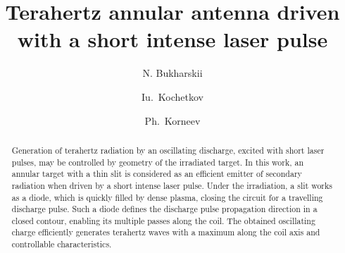 \documentclass[aps,prl,twocolumn,superscriptaddress]{revtex4-1}
\begin{document}

\title{Terahertz annular antenna driven with a short intense laser pulse}%


\author{N. Bukharskii}



\author{Iu.~Kochetkov}

\author{Ph.~Korneev}

\begin{abstract}
Generation of terahertz radiation by an oscillating discharge, excited with short laser pulses, may be controlled by geometry of the irradiated target. In this work, an annular target with a thin slit is considered as an efficient emitter of secondary radiation when driven by a short intense laser pulse. Under the irradiation, a slit works as a diode, which is quickly filled by dense plasma, closing the circuit for a travelling discharge pulse. Such a diode defines the discharge pulse propagation direction in a closed contour, enabling its multiple passes along the coil. The obtained oscillating charge efficiently generates terahertz waves with a maximum along the coil axis and controllable characteristics.     
\end{abstract}

\maketitle


\end{document}
